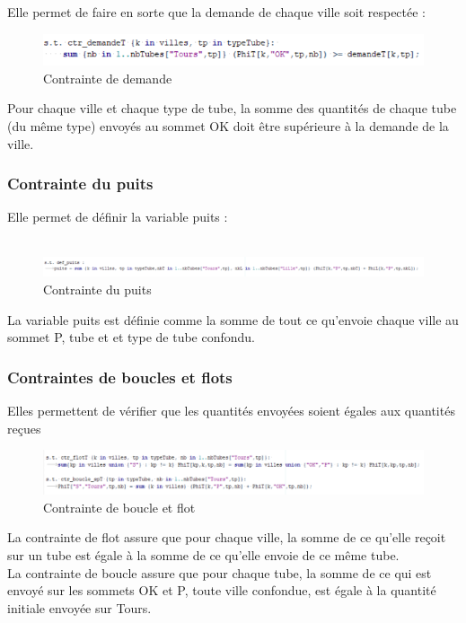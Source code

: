 \documentclass{polytech/polytech}
\numberwithin{figure}{chapter}
\begin{document}
Elle permet de faire en sorte que la demande de chaque ville soit respectée :

\begin{figure}[ht]
    \centering
    \includegraphics[width=\textwidth]{pic/demande.png}
    \caption{Contrainte de demande}
\end{figure}

Pour chaque ville et chaque type de tube, la somme des quantités de chaque tube (du même type) envoyés au sommet OK doit être supérieure à la demande de la ville.

\subsubsection{Contrainte du puits}

Elle permet de définir la variable puits :\\ \\

\begin{figure}[h]
    \centering
    \includegraphics[width=\textwidth]{pic/puits.png}
    \caption{Contrainte du puits}
\end{figure}

La variable puits est définie comme la somme de tout ce qu'envoie chaque ville au sommet P, tube et et type de tube confondu.

\subsubsection{Contraintes de boucles et flots}

Elles permettent de vérifier que les quantités envoyées soient égales aux quantités reçues

\begin{figure}[ht]
    \centering
    \includegraphics[width=\textwidth]{pic/flot.png}
    \caption{Contrainte de boucle et flot}
\end{figure}

La contrainte de flot assure que pour chaque ville, la somme de ce qu'elle reçoit sur un tube est égale à la somme de ce qu'elle envoie de ce même tube.\\
La contrainte de boucle assure que pour chaque tube, la somme de ce qui est envoyé sur les sommets OK et P, toute ville confondue, est égale à la quantité initiale envoyée sur Tours. 
\pagebreak
\end{document}
